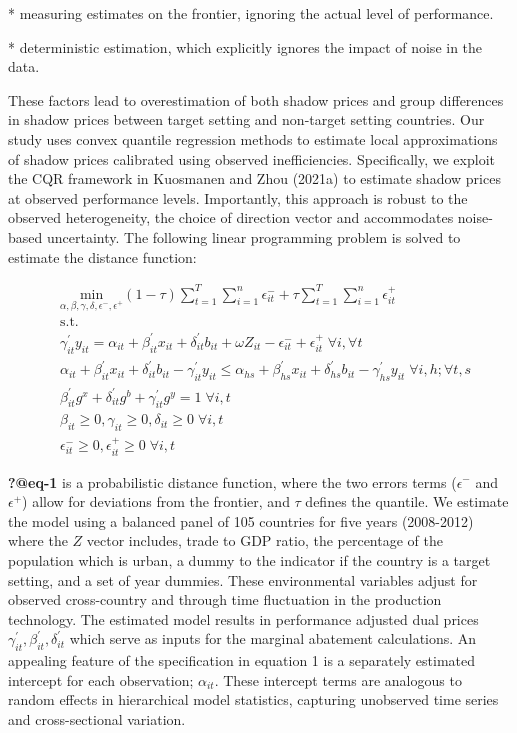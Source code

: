 \documentclass[
  letterpaper,
  DIV=11,
  numbers=noendperiod]{scrartcl}
\begin{document}
* measuring estimates on the frontier, ignoring the actual level of
performance.

* deterministic estimation, which explicitly ignores the impact of noise
in the data.

These factors lead to overestimation of both shadow prices and group
differences in shadow prices between target setting and non-target
setting countries. Our study uses convex quantile regression methods to
estimate local approximations of shadow prices calibrated using observed
inefficiencies. Specifically, we exploit the CQR framework in Kuosmanen
and Zhou (2021a) to estimate shadow prices at observed performance
levels. Importantly, this approach is robust to the observed
heterogeneity, the choice of direction vector and accommodates
noise-based uncertainty. The following linear programming problem is
solved to estimate the distance function:

\begin{equation}
\begin{split}
& \underset{\alpha,\beta,\gamma,\delta,\epsilon^-,\epsilon^+}{\text{min}} (1-\tau) \sum^{T}_{t=1} \sum^{n}_{i=1}\epsilon^-_{it} + \tau \sum^{T}_{t=1}  \sum^{n}_{i=1}\epsilon^+_{it}  \\&\text{s.t.} \\&\gamma^{'}_{it}y_{it}=\alpha_{it}+\beta^{'}_{it}x_{it}+\delta^{'}_{it}b_{it} + \omega Z_{it} -\epsilon^-_{it}+\epsilon^+_{it} \; \forall i ,\forall t \\&\alpha_{it}+\beta^{'}_{it}x_{it}+\delta^{'}_{it}b_{it}-\gamma^{'}_{it}y_{it} \leq \alpha_{hs}+\beta^{'}_{hs}x_{it}+\delta^{'}_{hs}b_{it}-\gamma^{'}_{hs}y_{it} \; \forall i,h ; \forall t,s \\& \beta^{'}_{it}g^x+\delta^{'}_{it}g^b+\gamma^{'}_{it}g^y=1 \; \forall i,t\\& \beta_{it} \geq0,\gamma_{it} \geq0,\delta_{it} \geq0 \; \forall i,t \\& \epsilon^-_{it} \geq0, \epsilon^+_{it} \geq 0 \; \forall i,t
\end{split}
\end{equation}

\textbf{?@eq-1} is a probabilistic distance function, where the two
errors terms (\(\epsilon^-\) and \(\epsilon^+\)) allow for deviations
from the frontier, and \(\tau\) defines the quantile. We estimate the
model using a balanced panel of 105 countries for five years (2008-2012)
where the \(Z\) vector includes, trade to GDP ratio, the percentage of
the population which is urban, a dummy to the indicator if the country
is a target setting, and a set of year dummies. These environmental
variables adjust for observed cross-country and through time fluctuation
in the production technology. The estimated model results in performance
adjusted dual prices \(\gamma^{'}_{it},\beta^{'}_{it} ,\delta^{'}_{it}\)
which serve as inputs for the marginal abatement calculations. An
appealing feature of the specification in equation 1 is a separately
estimated intercept for each observation; \(\alpha_{it}\). These
intercept terms are analogous to random effects in hierarchical model
statistics, capturing unobserved time series and cross-sectional
variation.
\end{document}
